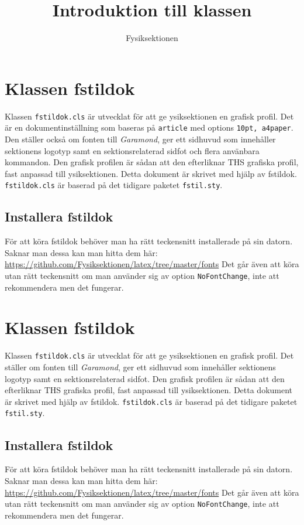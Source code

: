\documentclass{fstildok}
\title{Introduktion till klassen \NoCaseChange{\texttt{fstildok.cls}} }
\date{}
\author{Fysiksektionen}
\begin{document}
\ftitlepage
\ftoc

\section{Klassen fstildok}
Klassen \texttt{fstildok.cls} är utvecklat för att ge \F ysiksektionen en grafisk profil. Det är en dokumentinställning som baseras på \texttt{article} med options \texttt{10pt, a4paper}. Den ställer också om fonten till \textit{Garamond}, ger ett sidhuvud som innehåller sektionens logotyp samt en sektionsrelaterad sidfot och flera använbara kommandon. Den grafisk profilen är sådan att den efterliknar THS grafiska profil, fast anpassad till \F ysiksektionen. Detta dokument är skrivet med hjälp av fstildok. \texttt{fstildok.cls} är baserad på det tidigare paketet \texttt{fstil.sty}.

\subsection{Installera fstildok}
För att köra fstildok behöver man ha rätt teckensnitt installerade på sin datorn. Saknar man dessa kan man hitta dem här: \href{https://github.com/Fysiksektionen/latex/tree/master/fonts}{https://github.com/Fysiksektionen/latex/tree/master/fonts}
Det går även att köra utan rätt teckensnitt om man använder sig av option \texttt{NoFontChange}, inte att rekommendera men det fungerar.

\section{Klassen fstildok}
Klassen \texttt{fstildok.cls} är utvecklat för att ge \F ysiksektionen en grafisk profil. Det ställer om fonten till \textit{Garamond}, ger ett sidhuvud som innehåller sektionens logotyp samt en sektionsrelaterad sidfot. Den grafisk profilen är sådan att den efterliknar THS grafiska profil, fast anpassad till \F ysiksektionen. Detta dokument är skrivet med hjälp av fstildok. \texttt{fstildok.cls} är baserad på det tidigare paketet \texttt{fstil.sty}.

\subsection{Installera fstildok}
För att köra fstildok behöver man ha rätt teckensnitt installerade på sin datorn. Saknar man dessa kan man hitta dem här: \href{https://github.com/Fysiksektionen/latex/tree/master/fonts}{https://github.com/Fysiksektionen/latex/tree/master/fonts}
Det går även att köra utan rätt teckensnitt om man använder sig av option \texttt{NoFontChange}, inte att rekommendera men det fungerar.
\end{document}
